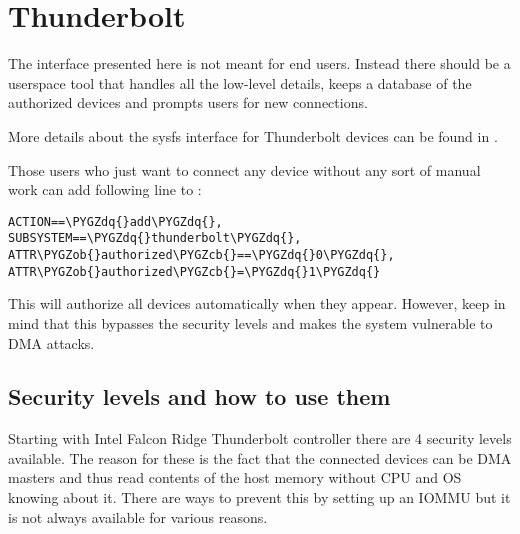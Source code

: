 \documentclass[a4paper,8pt,english]{sphinxmanual}
\def\PYGZob{\char`\{}
\def\PYGZcb{\char`\}}
\def\PYGZdq{\char`\"}
\begin{document}
\chapter{Thunderbolt}
\label{admin-guide/thunderbolt:thunderbolt}\label{admin-guide/thunderbolt:acpi-specification}\label{admin-guide/thunderbolt::doc}
The interface presented here is not meant for end users. Instead there
should be a userspace tool that handles all the low-level details, keeps
a database of the authorized devices and prompts users for new connections.

More details about the sysfs interface for Thunderbolt devices can be
found in .

Those users who just want to connect any device without any sort of
manual work can add following line to
:

\begin{Verbatim}[commandchars=\\\{\}]
ACTION==\PYGZdq{}add\PYGZdq{}, SUBSYSTEM==\PYGZdq{}thunderbolt\PYGZdq{}, ATTR\PYGZob{}authorized\PYGZcb{}==\PYGZdq{}0\PYGZdq{}, ATTR\PYGZob{}authorized\PYGZcb{}=\PYGZdq{}1\PYGZdq{}
\end{Verbatim}

This will authorize all devices automatically when they appear. However,
keep in mind that this bypasses the security levels and makes the system
vulnerable to DMA attacks.


\section{Security levels and how to use them}
\label{admin-guide/thunderbolt:security-levels-and-how-to-use-them}
Starting with Intel Falcon Ridge Thunderbolt controller there are 4
security levels available. The reason for these is the fact that the
connected devices can be DMA masters and thus read contents of the host
memory without CPU and OS knowing about it. There are ways to prevent
this by setting up an IOMMU but it is not always available for various
reasons.
\end{document}
